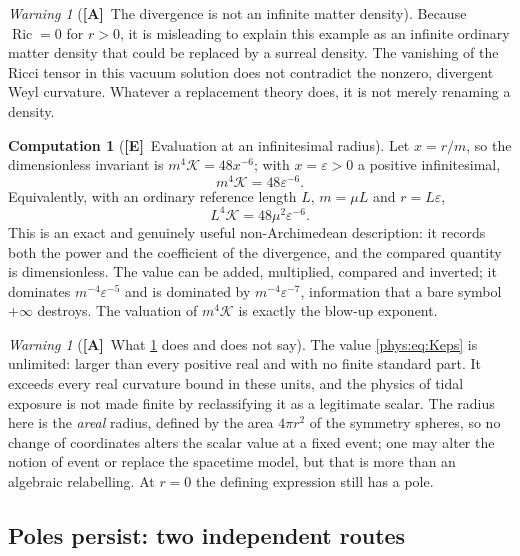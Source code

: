 \documentclass[11pt,letterpaper]{article}
\numberwithin{equation}{section}
\theoremstyle{definition}
\newtheorem{computation}[theorem]{Computation}
\theoremstyle{remark}
\newtheorem{warning}[theorem]{Warning}
\newcommand{\eps}{\varepsilon}
\newcommand{\Kret}{\mathcal K}
\DeclareMathOperator{\Ric}{Ric}
\newcommand{\TE}{\textcolor{TierE}{\textsf{\bfseries[E]}}}
\newcommand{\TA}{\textcolor{TierA}{\textsf{\bfseries[A]}}}
\begin{document}
\begin{warning}[\TA\ The divergence is not an infinite matter density]
\label{phys:warn:weyl}
Because $\Ric=0$ for $r>0$, it is misleading to explain this example as an
infinite ordinary matter density that could be replaced by a surreal density.
The vanishing of the Ricci tensor in this vacuum solution does not contradict
the nonzero, divergent Weyl curvature. Whatever a replacement theory does, it
is not merely renaming a density.
\end{warning}

\begin{computation}[\TE\ Evaluation at an infinitesimal radius]
\label{phys:comp:Keps}
Let $x=r/m$, so the dimensionless invariant is $m^{4}\Kret=48x^{-6}$; with
$x=\eps>0$ a positive infinitesimal,
\begin{equation}\label{phys:eq:Keps}
m^{4}\Kret=48\eps^{-6}.
\end{equation}
Equivalently, with an ordinary reference length $L$, $m=\mu L$ and $r=L\eps$,
\begin{equation}\label{phys:eq:KepsL}
L^{4}\Kret=48\mu^{2}\eps^{-6}.
\end{equation}
This is an exact and genuinely useful non-Archimedean description: it records
both the power and the coefficient of the divergence, and the compared quantity
is dimensionless. The value can be added, multiplied, compared and inverted; it
dominates $m^{-4}\eps^{-5}$ and is dominated by $m^{-4}\eps^{-7}$, information
that a bare symbol $+\infty$ destroys. The valuation of $m^{4}\Kret$ is exactly
the blow-up exponent.
\end{computation}

\begin{warning}[\TA\ What \cref{phys:comp:Keps} does and does not say]
\label{phys:warn:Keps}
The value \eqref{phys:eq:Keps} is unlimited: larger than every positive real
and with no finite standard part. It exceeds every real curvature bound in
these units, and the physics of tidal exposure is not made finite by
reclassifying it as a legitimate scalar. The radius here is the \emph{areal}
radius, defined by the area $4\pi r^{2}$ of the symmetry spheres, so no change
of coordinates alters the scalar value at a fixed event; one may alter the
notion of event or replace the spacetime model, but that is more than an
algebraic relabelling. At $r=0$ the defining expression still has a pole.
\end{warning}

\subsection{Poles persist: two independent routes}
\label{phys:sub:pole}
\end{document}
